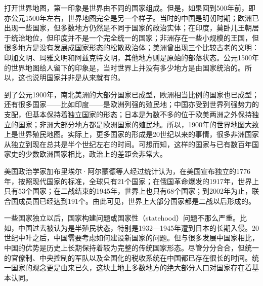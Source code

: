 





打开世界地图，第一印象是世界由不同的国家组成。但是，如果回到500年前，即亦公元1500年左右，世界地图完全是另一个样子。当时的中国是明朝时期；欧洲已出现一些国家，但多数地方仍然是不同于国家的政治实体；在印度，莫卧儿王朝居于统治地位，但印度并不是一个完全统一的国家；非洲存在一些小规模的王国，但很多地方是没有发展成国家形态的松散政治体；美洲曾出现三个比较古老的文明：印加文明、玛雅文明和阿兹克特文明，其他地方则是原始的部落状态。公元1500年的世界地图给人留下的印象是，当时世界上并没有多少地方是由国家统治的。所以，这也说明国家并非是从来就有的。

到了公元1900年，南北美洲的大部分国家已成型，欧洲相当比例的国家也已成型；还有很多国家——比如印度——是欧洲列强的殖民地；中国亦受到世界列强势力的支配，但基本保持着独立国家的形态；日本是为数不多的位于欧美两洲之外保持独立的国家；非洲大部分地方都是欧洲国家的殖民地。所以，1900年的世界地图大致上是世界殖民地图。实际上，更多国家的形成是20世纪以来的事情，很多非洲国家从独立到现在总共是半个世纪左右的时间。可想而知，这样的国家与已有数百年国家史的少数欧洲国家相比，政治上的差距会非常大。

美国政治学家加布里埃尔·阿尔蒙德等人经过统计认为，在美国宣布独立的1776年，按照现代国家的标准，全球只有21个国家；在俄国革命爆发的1917年，世界上只有53个国家；在二战结束的1945年，世界上也只有68个国家；到2002年为止，联合国成员国已经达到191个。由此可见，世界上大部分国家都是二战以后形成的。

一些国家独立以后，国家构建问题或国家性（statehood）问题不那么严重。比如，中国过去被认为是半殖民状态，特别是1932—1945年遭到日本的长期入侵。20世纪中叶之后，中国需要考虑如何建设新国家的问题。但与很多发展中国家相比，中国的优势是历史上长期保持着较为完整的传统国家形态。尽管分分合合，但统一的官僚制、中央控制的军队以及全国化的税收系统在中国都已存在很长的时间。统一国家的观念更是由来已久，这块土地上多数地方的绝大部分人口对国家存在着基本认同。


